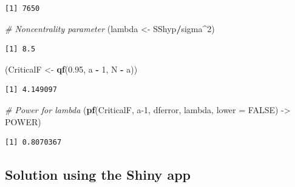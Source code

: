 \documentclass[
]{article}
\newenvironment{Shaded}{\begin{snugshade}}{\end{snugshade}}
\newcommand{\AttributeTok}[1]{\textcolor[rgb]{0.13,0.29,0.53}{#1}}
\newcommand{\CommentTok}[1]{\textcolor[rgb]{0.56,0.35,0.01}{\textit{#1}}}
\newcommand{\ConstantTok}[1]{\textcolor[rgb]{0.56,0.35,0.01}{#1}}
\newcommand{\DecValTok}[1]{\textcolor[rgb]{0.00,0.00,0.81}{#1}}
\newcommand{\FloatTok}[1]{\textcolor[rgb]{0.00,0.00,0.81}{#1}}
\newcommand{\FunctionTok}[1]{\textcolor[rgb]{0.13,0.29,0.53}{\textbf{#1}}}
\newcommand{\NormalTok}[1]{#1}
\newcommand{\OtherTok}[1]{\textcolor[rgb]{0.56,0.35,0.01}{#1}}
\newcommand{\SpecialCharTok}[1]{\textcolor[rgb]{0.81,0.36,0.00}{\textbf{#1}}}
\begin{document}
\begin{verbatim}
[1] 7650
\end{verbatim}

\begin{Shaded}
\begin{Highlighting}[]
\CommentTok{\# Noncentrality parameter}
\NormalTok{(lambda }\OtherTok{\textless{}{-}}\NormalTok{ SShyp}\SpecialCharTok{/}\NormalTok{sigma}\SpecialCharTok{\^{}}\DecValTok{2}\NormalTok{)}
\end{Highlighting}
\end{Shaded}

\begin{verbatim}
[1] 8.5
\end{verbatim}

\begin{Shaded}
\begin{Highlighting}[]
\NormalTok{(CriticalF }\OtherTok{\textless{}{-}} \FunctionTok{qf}\NormalTok{(}\FloatTok{0.95}\NormalTok{, a }\SpecialCharTok{{-}} \DecValTok{1}\NormalTok{, N }\SpecialCharTok{{-}}\NormalTok{ a))}
\end{Highlighting}
\end{Shaded}

\begin{verbatim}
[1] 4.149097
\end{verbatim}

\begin{Shaded}
\begin{Highlighting}[]
\CommentTok{\# Power for lambda}
\NormalTok{(}\FunctionTok{pf}\NormalTok{(CriticalF, a}\DecValTok{{-}1}\NormalTok{, dferror, lambda, }\AttributeTok{lower =} \ConstantTok{FALSE}\NormalTok{) }\OtherTok{{-}\textgreater{}}\NormalTok{ POWER)}
\end{Highlighting}
\end{Shaded}

\begin{verbatim}
[1] 0.8070367
\end{verbatim}

\hypertarget{solution-using-the-shiny-app}{%
\subsection*{Solution using the Shiny app}\label{solution-using-the-shiny-app}}
\end{document}
